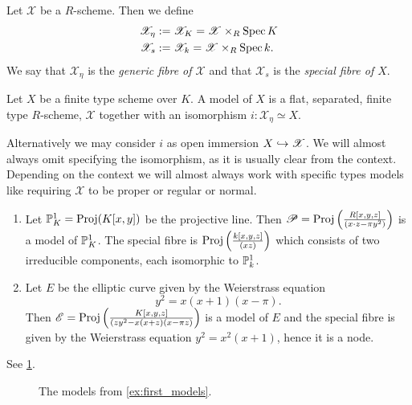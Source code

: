 \begin{definition}
	Let $\mathscr X$ be a $R$-scheme. 
	Then we define 
	\begin{align*}
		\mathscr X_\eta &:= \mathscr X_K = \mathscr X \times_R \operatorname{Spec} K \\
		\mathscr X_s &:= \mathscr X_k = \mathscr X \times_R \operatorname{Spec} k 
	.\end{align*}
	We say that $\mathscr X_\eta$ is the \emph{generic fibre of $\mathscr X$} and that $\mathscr X_s$ is the \emph{special fibre of $X$}. 
\end{definition}
\begin{definition}
	Let $X$ be a finite type scheme over $K$.  
	A model of $X$ is a flat, separated, finite type $R$-scheme, $\mathscr X$ together with an isomorphism $i: \mathscr X_\eta \simeq X$.
\end{definition}
Alternatively we may consider $i$ as open immersion $X\hookrightarrow \mathscr X$. 
We will almost always omit specifying the isomorphism, as it is usually clear from the context. 
Depending on the context we will almost always work with specific types models like requiring $\mathscr X$ to be proper or regular or normal.

\begin{example}\label{ex:first_models}
	\begin{enumerate}
		\item Let $\mathbb{P}^{1}_K = \operatorname{Proj}(K[x, y])$ be the projective line. 
			Then $\mathscr P = \operatorname{Proj}\left(\frac{R[x, y, z]}{(x\cdot z - \pi y^2)}\right)$ is a model of $\mathbb{P}^{1}_K$. 
			The special fibre is $\operatorname{Proj}\left( \frac{k[x, y, z]}{(xz)} \right) $ which consists of two irreducible components, each isomorphic to $\mathbb{P}^{1}_k$.  
		\item Let $E$ be the elliptic curve given by the Weierstrass equation \[
				y^2 = x (x +1)(x-\pi)
		.\] 
		Then $\mathscr E = \operatorname{Proj} \left( \frac{K[x, y, z]}{(zy^2 - x(x+z)(x-\pi z)} \right) $ is a model of $E$ and the special fibre is given by the Weierstrass equation $y^2 = x^2 (x+1)$, hence it is a node. 
	\end{enumerate}
	See \cref{fig:first_examples_of_models}.
\end{example}

\begin{figure}[h]
    \centering
    \caption{The models from \cref{ex:first_models}.}
    \label{fig:first_examples_of_models}
\end{figure}

